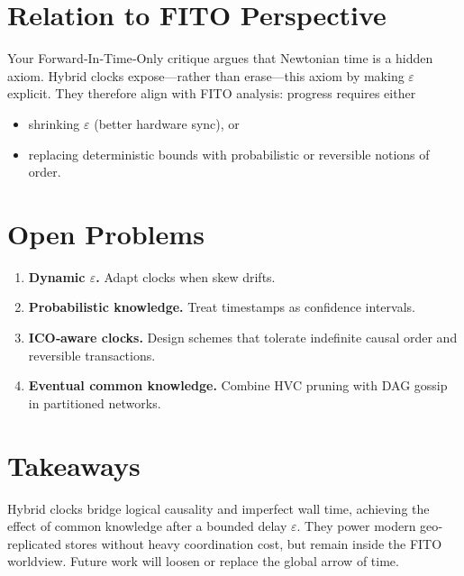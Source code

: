 \section{Relation to FITO Perspective}

Your Forward‑In‑Time‑Only critique argues that Newtonian time is a
hidden axiom.  Hybrid clocks expose—rather than erase—this axiom by
making $\varepsilon$ explicit.  They therefore align with FITO analysis:
progress requires either

\begin{itemize}
\item shrinking $\varepsilon$ (better hardware sync), or
\item replacing deterministic bounds with probabilistic or
      reversible notions of order.
\end{itemize}

\section{Open Problems}

\begin{enumerate}
\item \textbf{Dynamic $\varepsilon$.}  Adapt clocks when skew drifts.
\item \textbf{Probabilistic knowledge.}  Treat timestamps as confidence
      intervals.
\item \textbf{ICO‑aware clocks.}  Design schemes that tolerate
      indefinite causal order and reversible transactions.
\item \textbf{Eventual common knowledge.}  Combine HVC pruning with DAG
      gossip in partitioned networks.
\end{enumerate}

\section{Takeaways}

Hybrid clocks bridge logical causality and imperfect wall time,
achieving the effect of common knowledge after a bounded delay
$\varepsilon$.  They power modern geo‐replicated stores without heavy
coordination cost, but remain inside the FITO worldview.  Future work
will loosen or replace the global arrow of time.

